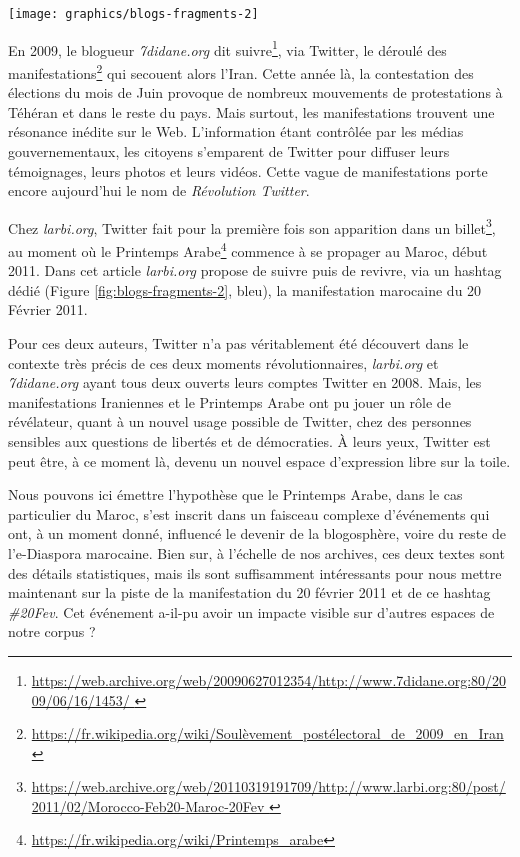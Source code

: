 \documentclass[symmetric,justified,marginals=raggedouter]{tufte-book}
\begin{document}
\begin{figure*}
  \texttt{[image: graphics/blogs-fragments-2]}
  \caption{Premiers fragments Web archivés faisant mention de Twitter chez \textit{larbi.org} \textit{7didane.org}}
  \label{fig:blogs-fragments-2}
\end{figure*}

\noindent En 2009, le blogueur \textit{7didane.org} dit suivre\footnote{\url{https://web.archive.org/web/20090627012354/http://www.7didane.org:80/2009/06/16/1453/
}}, via Twitter, le déroulé des manifestations\footnote{\url{https://fr.wikipedia.org/wiki/Soulèvement\_postélectoral\_de\_2009\_en\_Iran}} qui secouent alors l'Iran. Cette année là, la contestation des élections du mois de Juin provoque de nombreux mouvements de protestations à Téhéran et dans le reste du pays. Mais surtout, les manifestations trouvent une résonance inédite sur le Web. L'information étant contrôlée par les médias gouvernementaux, les ci\-toyens s'emparent de Twitter pour diffuser leurs témoignages, leurs photos et leurs vidéos. Cette vague de manifestations porte encore aujourd'hui le nom de \textit{Révolution Twitter}. 

Chez \textit{larbi.org}, Twitter fait pour la première fois son apparition dans un billet\footnote{\url{https://web.archive.org/web/20110319191709/http://www.larbi.org:80/post/2011/02/Morocco-Feb20-Maroc-20Fev
}}, au moment où le Printemps Arabe\footnote{\url{https://fr.wikipedia.org/wiki/Printemps_arabe}} commence à se pro\-pager au Maroc, début 2011. Dans cet article \textit{larbi.org} propose de suivre puis de revivre, via un hashtag dédié (Figure \ref{fig:blogs-fragments-2}, bleu), la manifestation marocaine du 20 Février 2011.

Pour ces deux auteurs, Twitter n'a pas véritablement été découvert dans le contexte très précis de ces deux moments révolutionnaires, \textit{larbi.org} et \textit{7didane.org} ayant tous deux ouverts leurs comptes Twitter en 2008. Mais, les manifestations Iraniennes et le Printemps Arabe ont pu jouer un rôle de révélateur, quant à un nouvel usage possible de Twitter, chez des personnes sensibles aux questions de libertés et de démocraties. À leurs yeux, Twitter est peut être, à ce moment là, devenu un nouvel espace d'expression libre sur la toile. 

Nous pouvons ici émettre l'hypothèse que le Printemps Arabe, dans le cas particulier du Maroc, s'est inscrit dans un faisceau complexe d'événements qui ont, à un moment donné, influencé le devenir de la blogosphère, voire du reste de l'e-Diaspora marocaine. Bien sur, à l'échelle de nos archives, ces deux textes sont des détails statistiques, mais ils sont suffisamment intéressants pour nous mettre maintenant sur la piste de la manifestation du 20 février 2011 et de ce hashtag \textit{\#20Fev}. Cet événement a-il-pu avoir un impacte visible sur d'autres espaces de notre corpus ?
\end{document}
